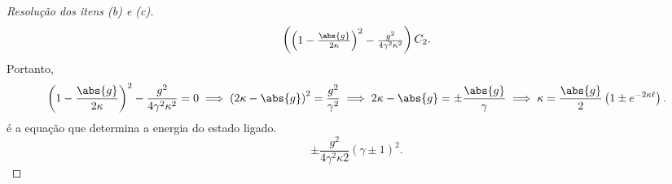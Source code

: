 \begin{proof}[Resolução dos itens (b) e (c)]
\begin{equation*}
\begin{pmatrix}
             \left(1 - \frac{\abs{g}}{2 \kappa}\right)^2 - \frac{g^2}{4 \gamma^2 \kappa^2}
        \end{pmatrix}
        C_2.
    \end{equation*}
    Portanto,
    \begin{equation*}
        \left(1 - \frac{\abs{g}}{2 \kappa}\right)^2 - \frac{g^2}{4 \gamma^2 \kappa^2} = 0 \implies \left(2\kappa - \abs{g}\right)^2 = \frac{g^2}{\gamma^2} \implies 2 \kappa - \abs{g} = \pm \frac{\abs{g}}{\gamma} \implies \kappa = \frac{\abs{g}}{2}\left(1 \pm e^{-2 \kappa \ell}\right).
    \end{equation*}
    é a equação que determina a energia do estado ligado.
    \begin{equation*}
        \pm \frac{g^2}{4 \gamma^2 \kappa 2}(\gamma \pm 1)^2.
    \end{equation*}
\end{proof}
